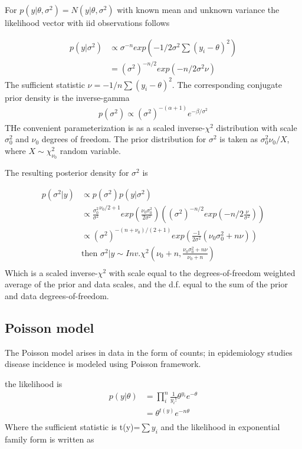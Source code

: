 \documentclass[
]{book}
\theoremstyle{definition}
\theoremstyle{definition}
\theoremstyle{definition}
\theoremstyle{definition}
\theoremstyle{remark}
\begin{document}
For \(p(y|\theta,\sigma^2)=N(y|\theta,\sigma^2)\) with known mean and unknown variance the likelihood vector with iid observations follows

\[
\begin{aligned}
 p( y | \sigma^2 ) &\propto \sigma^{-n}exp(-1/2\sigma^2 \sum (y_i - \theta)^2) \\
   &= (\sigma^2)^{-n/2}exp(-n/2\sigma^2 \nu)
   \end{aligned}
\]
The sufficient statistic \(\nu = -1/n \sum (y_i-\theta)^2\). The corresponding conjugate prior density is the inverse-gamma
\[
\begin{aligned}
p(\sigma^2)\propto (\sigma^2)^{-(\alpha+1)}e^{-\beta/\sigma^2}
\end{aligned}
\]
THe convenient parameterization is as a scaled inverse-\(\chi^2\) distribution with scale \(\sigma_0^2\) and \(\nu_0\) degrees of freedom. The prior distribution for \(\sigma^2\) is taken as \(\sigma_0^2\nu_0/X\), where \(X\sim \chi_{\nu_0}^2\) random variable.

The resulting posterior density for \(\sigma^2\) is

\[
\begin{aligned}
p(\sigma^2| y) &\propto p(\sigma^2)p(y|\sigma^2)\\
&\propto \frac{\sigma_0^2}{\sigma^2}^{\nu_0/2+1}exp(\frac{\nu_0\sigma_0^2}{2\sigma^2})((\sigma^2)^{-n/2} exp(-n/2\frac{\nu}{\sigma^2}))\\ 
&\propto (\sigma^2)^{-(n+\nu_0)/(2+1)}exp(\frac{-1}{2\sigma^2}(\nu_0\sigma_0^2+n\nu))\\
&\text{then   } \sigma^2 | y \sim Inv.\chi^2 (\nu_0+n, \frac{\nu_0\sigma_0^2+ n\nu}{\nu_0+n})\\
\end{aligned}
\]
Which is a scaled inverse-\(\chi^2\) with scale equal to the degrees-of-freedom weighted average of the prior and data scales, and the d.f. equal to the sum of the prior and data degrees-of-freedom.

\hypertarget{poisson-model}{%
\subsection*{Poisson model}\label{poisson-model}}

The Poisson model arises in data in the form of counts; in epidemiology studies disease incidence is modeled using Poisson framework.

the likelihood is
\[
\begin{aligned}
p(y|\theta)&= \prod_i^n \frac{1}{y_i!}\theta^{y_i}e^{-\theta}\\
&=\theta^{t(y)}e^{-n\theta}\\
\end{aligned}
\]
Where the sufficient statistic is t(y)=\(\sum y_i\) and the likelihood in exponential family form is written as
\end{document}
